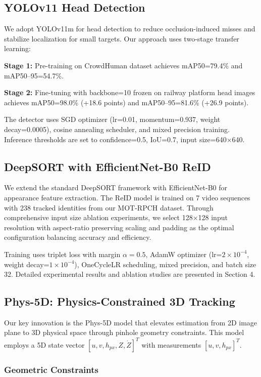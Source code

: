 \subsection{YOLOv11 Head Detection}

We adopt YOLOv11m for head detection to reduce occlusion-induced misses and stabilize localization for small targets. Our approach uses two-stage transfer learning:

\textbf{Stage 1:} Pre-training on CrowdHuman dataset achieves mAP50=79.4\% and mAP50–95=54.7\%.

\textbf{Stage 2:} Fine-tuning with backbone=10 frozen on railway platform head images achieves mAP50=98.0\% (+18.6 points) and mAP50–95=81.6\% (+26.9 points).

The detector uses SGD optimizer (lr=0.01, momentum=0.937, weight decay=0.0005), cosine annealing scheduler, and mixed precision training. Inference thresholds are set to confidence=0.5, IoU=0.7, input size=640×640.

\subsection{DeepSORT with EfficientNet-B0 ReID}

We extend the standard DeepSORT framework with EfficientNet-B0 for appearance feature extraction. The ReID model is trained on 7 video sequences with 238 tracked identities from our MOT-RPCH dataset. Through comprehensive input size ablation experiments, we select 128×128 input resolution with aspect-ratio preserving scaling and padding as the optimal configuration balancing accuracy and efficiency.

Training uses triplet loss with margin $\alpha=0.5$, AdamW optimizer (lr=$2 \times 10^{-4}$, weight decay=$1 \times 10^{-4}$), OneCycleLR scheduling, mixed precision, and batch size 32. Detailed experimental results and ablation studies are presented in Section 4.

\subsection{Phys-5D: Physics-Constrained 3D Tracking}

Our key innovation is the Phys-5D model that elevates estimation from 2D image plane to 3D physical space through pinhole geometry constraints. This model employs a 5D state vector $[u, v, h_{px}, Z, \dot{Z}]^T$ with measurements $[u, v, h_{px}]^T$.

\subsubsection{Geometric Constraints}

